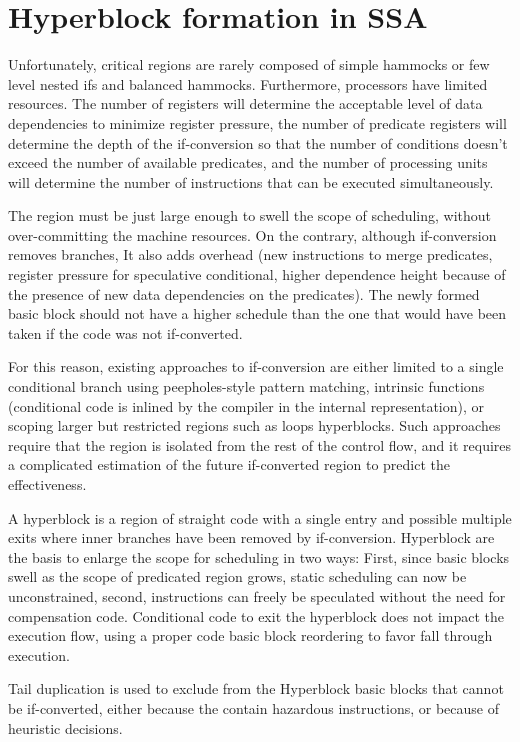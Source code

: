 \section{Hyperblock formation in SSA}

Unfortunately, critical regions are rarely composed of simple hammocks or few level nested ifs and balanced hammocks. Furthermore, processors have limited resources. The number of registers will determine the acceptable level of data dependencies to minimize register pressure, the number of predicate registers will determine the depth of the if-conversion so that the number of conditions doesn't exceed the number of available predicates, and the number of processing units will determine the number of instructions that can be executed simultaneously.

The region must be just large enough to swell the scope of scheduling, without over-committing the machine resources. On the contrary, although if-conversion removes branches, It also adds overhead (new instructions to merge predicates, register pressure for speculative conditional, higher dependence height because of the presence of new data dependencies on the predicates). The newly formed basic block should not have a higher schedule than the one that would have been taken if the code was not if-converted.

For this reason, existing approaches to if-conversion are either limited to a single conditional branch using peepholes-style pattern matching, intrinsic functions (conditional code is inlined by the compiler in the internal representation), or scoping larger but restricted regions such as loops hyperblocks. Such approaches require that the region is isolated from the rest of the control flow, and it requires a complicated estimation of the future if-converted region to predict the effectiveness.

A hyperblock is a region of straight code with a single entry and possible multiple exits where inner branches have been removed by if-conversion.
Hyperblock are the basis to enlarge the scope for scheduling in two ways: First, since basic blocks swell as the scope of predicated region grows, static scheduling can now be unconstrained, second, instructions can freely be speculated without the need for compensation code. Conditional code to exit the hyperblock does not impact the execution flow, using a proper code basic block reordering to favor fall through execution.

Tail duplication is used to exclude from the Hyperblock basic blocks that cannot be if-converted, either because the contain hazardous instructions, or because of heuristic decisions.

